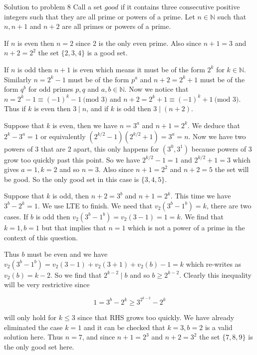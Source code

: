 \documentclass{article}
\begin{document}
\begin{solution}{Solution to problem 8}
Call a set $\textit{good}$ if it contains three consecutive positive
integers such that they are all prime or powers of a prime.
Let $n \in \mathbb{N}$ such that $n, n+1$ and $n+2$ are all primes or powers
of a prime. \vspace{0.2cm}

If $n$ is even then $n=2$ since 2 is the only even prime.
Also since $n+1 = 3$ and $n+2 = 2^2$ the set $\{2, 3, 4\}$ is a good set.
\vspace{0.2cm}

If $n$ is odd then $n+1$ is even which means it must be of the form $2^k$
for $k \in \mathbb{N}$. Similarly $n = 2^k-1$ must be of the form $p^a$
and $n+2=2^k+1$ must be of the form $q^b$ for odd primes $p,q$ and
$a,b \in \mathbb{N}$. Now we notice that
$n = 2^k - 1 \equiv (-1)^k - 1 \ \text{(mod } 3)$ and
$n + 2 = 2^k + 1 \equiv (-1)^k + 1 \ \text{(mod } 3)$. Thus
if $k$ is even then $3 \mid n$, and if $k$ is odd then $3 \mid (n+2)$.
\vspace{0.2cm}

Suppose that $k$ is even, then we have $n = 3^a$ and $n+1 = 2^k$. We deduce that
$2^k - 3^a = 1$ or equivalently $(2^{k/2}-1)(2^{k/2}+1)=3^a = n$. Now we
have two
powers of 3 that are 2 apart, this only happens for $(3^0, 3^1)$ because
powers of 3 grow too quickly past this point. So we have $2^{k/2}-1=1$ and
$2^{k/2}+1=3$ which gives $a=1, k=2$ and so $n=3$. Also since $n+1=2^2$ and
$n+2=5$ the set will be good. So the only good set in this
case is $\{3, 4, 5 \}$.
\vspace{0.2cm}

Suppose that $k$ is odd, then $n+2=3^b$ and $n+1 = 2^k$. This time we have
$3^b - 2^k = 1$. We use LTE to finish. We need that $v_2(3^b-1^b) = k$,
there are two cases. If $b$ is odd then $v_2(3^b-1^b) = v_2(3-1) = 1 = k$.
We find that $k=1, b=1$ but that implies that $n = 1$ which is not a power
of a prime in the context of this question. \vspace{0.2cm}

Thus $b$ must be even and we
have $v_2(3^b-1^b)= v_2(3-1) + v_2(3+1) + v_2(b) - 1 = k$ which re-writes
as $v_2(b) = k-2$. So we find that $2^{k-2} \mid b$ and so $b \geq 2^{k-2}$.
Clearly this inequality will be very restrictive since

$$
1 = 3^b - 2^k \geq 3^{2^{k-2}} - 2^k
$$

will only hold for $k \leq 3$ since that RHS grows too quickly. We have
already eliminated the case $k=1$ and it can be checked that $k=3, b=2$
is a valid solution here. Thus $n = 7$, and since $n+1=2^3$ and $n+2 = 3^2$
the set $\{7,8,9 \}$ is the only good set here. \vspace{0.2cm}


\end{solution}
\end{document}

